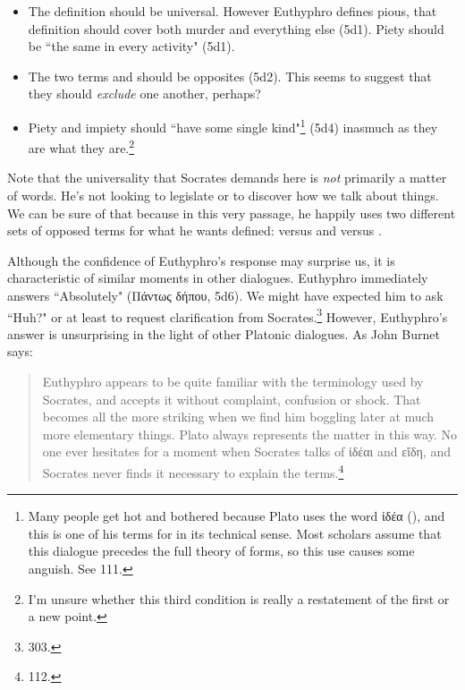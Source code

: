 \documentclass[12pt]{article}
\begin{document}
\begin{itemize}
    \item The definition should be universal.  However Euthyphro defines pious,
        that definition should cover both murder and everything else (5d1).
        Piety should be ``the same in every activity" (5d1).
    \item The two terms  and  should be opposites
        (5d2).  This seems to suggest that they should \emph{exclude} one
        another, perhaps?
    \item Piety and impiety should ``have some single kind"\footnote{Many
        people get hot and bothered because Plato uses the word {\g ἰδέα}
        (), and this is one of his terms for  in its
        technical sense.  Most scholars assume that this dialogue precedes the
        full theory of forms, so this use causes some anguish.  See
        \citet{burnet1924} 111.} (5d4) inasmuch as they are what they
        are.\footnote{I'm unsure whether this third condition is really
        a restatement of the first or a new point.}

\end{itemize}

Note that the universality that Socrates demands here is \emph{not} primarily
a matter of words.  He's not looking to legislate or to discover how we talk
about things.  We can be sure of that because in this very passage, he happily
uses two different sets of opposed terms for what he wants defined:
 versus  and  versus
.

Although the confidence of Euthyphro's response may surprise us, it is
characteristic of similar moments in other dialogues.  Euthyphro immediately
answers ``Absolutely" ({\g Πάντως δήπου}, 5d6).  We might have expected him to
ask ``Huh?" or at least to request clarification from
Socrates.\footnote{\citet{nehamas1975} 303.}  However, Euthyphro's answer is
unsurprising in the light of other Platonic dialogues.  As John Burnet says:

\begin{quote}

    Euthyphro appears to be quite familiar with the terminology used by
    Socrates, and accepts it without complaint, confusion or shock.  That
    becomes all the more striking when we find him boggling later at much more
    elementary things.  Plato always represents the matter in this way.  No one
    ever hesitates for a moment when Socrates talks of {\g ἰδέαι} and {\g
    εἴδη}, and Socrates never finds it necessary to explain the
    terms.\footnote{\citet{burnet1924} 112.}

\end{quote}
\end{document}
